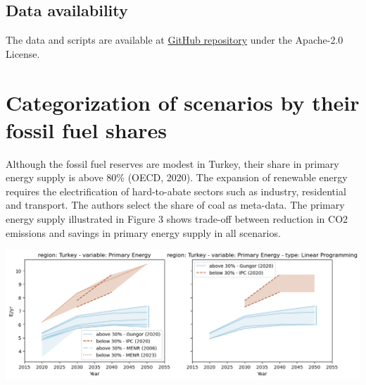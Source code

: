 \documentclass[a0,portrait]{a0poster}
\begin{document}
\begin{multicols}{3}


\begin{tcolorbox}[width=1.0\linewidth,colback={conclusion},frame empty]
\section{Data availability}

The data and scripts are available at \href{https://github.com/gorkemgungormetu/turkish\_energy\_and\_climate\_pathways.git}{GitHub repository} under the Apache-2.0 License.

\end{tcolorbox}    


\section{Categorization of scenarios by their fossil fuel shares}

Although the fossil fuel reserves are modest in Turkey, their share in primary energy supply is above 80\% (OECD, 2020). The expansion of renewable energy requires the electrification of hard-to-abate sectors such as industry, residential and transport. The authors select the share of coal as meta-data. The primary energy supply illustrated in Figure 3 shows trade-off between reduction in CO2 emissions and savings in primary energy supply in all scenarios.

\begin{center}\vspace{1cm}
    \includegraphics[width=1.0\linewidth]{Figure_3}
\end{center}\vspace{1cm}



\end{multicols}
\end{document}

